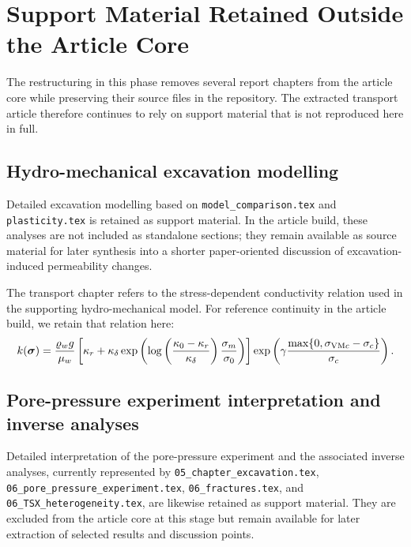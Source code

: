 \section{Support Material Retained Outside the Article Core}
\label{sec_append1}

The restructuring in this phase removes several report chapters from the article core while preserving their source files in the repository. The extracted transport article therefore continues to rely on support material that is not reproduced here in full.

\subsection{Hydro-mechanical excavation modelling}
\label{ch:model_comparison}

Detailed excavation modelling based on \texttt{model\_comparison.tex} and \texttt{plasticity.tex} is retained as support material. In the article build, these analyses are not included as standalone sections; they remain available as source material for later synthesis into a shorter paper-oriented discussion of excavation-induced permeability changes.

The transport chapter refers to the stress-dependent conductivity relation used in the supporting hydro-mechanical model. For reference continuity in the article build, we retain that relation here:
\begin{equation}
\label{eq:conductivity_relation}
k({\bm{\sigma}}) = \frac{\varrho_w g}{\mu_w} \left[
      \kappa_r + \kappa_\delta\exp\left(\log\left(\frac{\kappa_0 - \kappa_r}{\kappa_\delta}\right) \frac{\sigma_m}{\sigma_0}\right)
  \right] \exp\left(\gamma\frac{\max\{0,\sigma_{\mathrm{VM}c} - \sigma_c\}}{\sigma_c}\right).
\end{equation}

\subsection{Pore-pressure experiment interpretation and inverse analyses}
\label{ch:inversion}

Detailed interpretation of the pore-pressure experiment and the associated inverse analyses, currently represented by \texttt{05\_chapter\_excavation.tex}, \texttt{06\_pore\_pressure\_experiment.tex}, \texttt{06\_fractures.tex}, and \texttt{06\_TSX\_heterogeneity.tex}, are likewise retained as support material. They are excluded from the article core at this stage but remain available for later extraction of selected results and discussion points.
